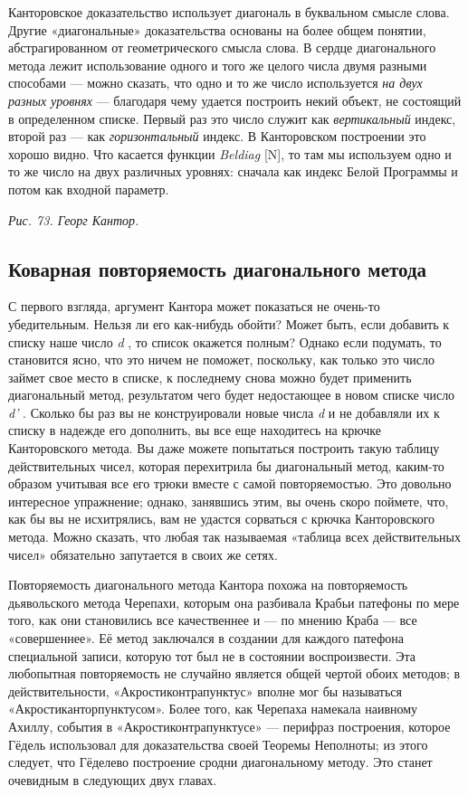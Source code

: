 \documentclass[../main.tex]{subfiles}
\begin{document}
Канторовское доказательство использует диагональ в буквальном смысле слова. Другие «диагональные» доказательства основаны на более общем понятии, абстрагированном от геометрического смысла слова. В сердце диагонального метода лежит использование одного и того же целого числа двумя разными способами --- можно сказать, что одно и то же число используется \emph{на двух разных уровнях} --- благодаря чему удается построить некий объект, не состоящий в определенном списке. Первый раз это число служит как \emph{вертикальный} индекс, второй раз --- как \emph{горизонтальный} индекс. В Канторовском построении это хорошо видно. Что касается функции \emph{Beldiag} {[}N{]}, то там мы используем одно и то же число на двух различных уровнях: сначала как индекс Белой Программы и потом как входной параметр.

\emph{Рис. 73. Георг Кантор.}


\subsection{Коварная повторяемость диагонального метода}

С первого взгляда, аргумент Кантора может показаться не очень-то убедительным. Нельзя ли его как-нибудь обойти? Может быть, если добавить к списку наше число \emph{d} , то список окажется полным? Однако если подумать, то становится ясно, что это ничем не поможет, поскольку, как только это число займет свое место в списке, к последнему снова можно будет применить диагональный метод, результатом чего будет недостающее в новом списке число \emph{d'} . Сколько бы раз вы не конструировали новые числа \emph{d} и не добавляли их к списку в надежде его дополнить, вы все еще находитесь на крючке Канторовского метода. Вы даже можете попытаться построить такую таблицу действительных чисел, которая перехитрила бы диагональный метод, каким-то образом учитывая все его трюки вместе с самой повторяемостью. Это довольно интересное упражнение; однако, занявшись этим, вы очень скоро поймете, что, как бы вы не исхитрялись, вам не удастся сорваться с крючка Канторовского метода. Можно сказать, что любая так называемая «таблица всех действительных чисел» обязательно запутается в своих же сетях.

Повторяемость диагонального метода Кантора похожа на повторяемость дьявольского метода Черепахи, которым она разбивала Крабьи патефоны по мере того, как они становились все качественнее и --- по мнению Краба --- все «совершеннее». Её метод заключался в создании для каждого патефона специальной записи, которую тот был не в состоянии воспроизвести. Эта любопытная повторяемость не случайно является общей чертой обоих методов; в действительности, «Акростиконтрапунктус» вполне мог бы называться «Акростиканторпунктусом». Более того, как Черепаха намекала наивному Ахиллу, события в «Акростиконтрапунктусе» --- перифраз построения, которое Гёдель использовал для доказательства своей Теоремы Неполноты; из этого следует, что Гёделево построение сродни диагональному методу. Это станет очевидным в следующих двух главах.
\end{document}
